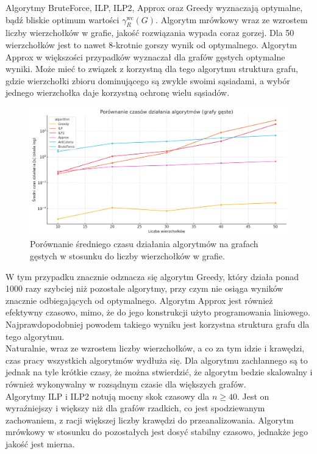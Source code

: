     Algorytmy BruteForce, ILP, ILP2, Approx oraz Greedy wyznaczają optymalne, bądź bliskie optimum wartości $\gamma^{\text{wc}}_R(G)$. Algorytm mrówkowy wraz ze wzrostem liczby wierzchołków w grafie, jakość rozwiązania wypada coraz gorzej. Dla 50 wierzchołków jest to nawet 8-krotnie gorszy wynik od optymalnego. Algorytm Approx w większości przypadków wyznaczał dla grafów gęstych optymalne wyniki. Może mieć to związek z korzystną dla tego algorytmu struktura grafu, gdzie wierzchołki zbioru dominującego są zwykle swoimi sąsiadami, a wybór jednego wierzchołka daje korzystną ochronę wielu sąsiadów.

    \begin{figure}[H]
        \centering
        \includegraphics[width=\textwidth]{assets/dense.png}
        \caption{Porównanie średniego czasu działania algorytmów na grafach gęstych w stosunku do liczby wierzchołków w grafie.}
        \label{fig:densePlot}
    \end{figure}

    W tym przypadku znacznie odznacza się algorytm Greedy, który działa ponad 1000 razy szybciej niż pozostałe algorytmy, przy czym nie osiąga wyników znacznie odbiegających od optymalnego. Algorytm Approx jest również efektywny czasowo, mimo, że do jego konstrukcji użyto programowania liniowego. Najprawdopodobniej powodem takiego wyniku jest korzystna struktura grafu dla tego algorytmu.\\
    Naturalnie, wraz ze wzrostem liczby wierzchołków, a co za tym idzie i krawędzi, czas pracy wszystkich algorytmów wydłuża się. Dla algorytmu zachłannego są to jednak na tyle krótkie czasy, że można stwierdzić, że algorytm bedzie skalowalny i również wykonywalny w rozsądnym czasie dla większych grafów.\\
    Algorytmy ILP i ILP2 notują mocny skok czasowy dla $n \geq 40 $. Jest on wyraźniejszy i większy niż dla grafów rzadkich, co jest spodziewanym zachowaniem, z racji większej liczby krawędzi do przeanalizowania.
    Algorytm mrówkowy w stosunku do pozostałych jest dosyć stabilny czasowo, jednakże jego jakość jest mierna.\\
    
